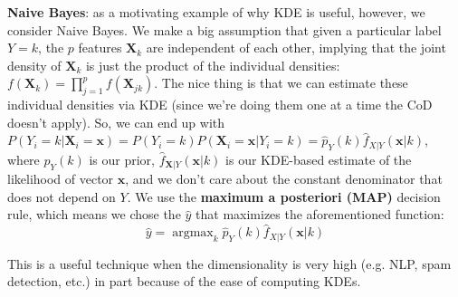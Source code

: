 \documentclass{article}
\DeclareMathOperator*{\argmax}{argmax}
\begin{document}
\textbf{Naive Bayes}: as a motivating example of why KDE is useful, however, we
consider Naive Bayes. We make a big assumption that given a particular label
$Y=k$, the $p$ features $\mathbf{X}_k$ are independent of each other, implying that 
the joint density of $\mathbf{X}_k$ is just the product of the individual
densities: $f(\mathbf{X}_k)= \prod_{j=1}^p f(\mathbf{X}_{jk})$. The nice thing
is that we can estimate these individual densities via KDE (since we're doing
them one at a time the CoD doesn't apply). So, we can end up with
$P(Y_i=k|\mathbf{X}_i=\mathbf{x}) =  P(Y_i=k)P(\mathbf{X}_i=\mathbf{x}|Y_i=k) =
\hat{p}_Y(k) \hat{f}_{X|Y}(\mathbf{x}|k)$, where $\hat{p}_Y(k)$ is our prior,
$\hat{f}_{\mathbf{X}|Y}(\mathbf{x}|k)$
is our KDE-based estimate of the likelihood of vector $\mathbf{x}$, and we don't
care about the constant denominator that does not depend on $Y$. We use the
\textbf{maximum a posteriori (MAP)} decision rule, which means we chose the
$\hat{y}$ that maximizes the aforementioned function: 
$$\hat{y} = \argmax_k \hat{p}_Y(k) \hat{f}_{X|Y}(\mathbf{x}|k)$$

This is a useful technique when the dimensionality is very high (e.g. NLP, spam
detection, etc.) in part because of the ease of computing KDEs.
\end{document}
